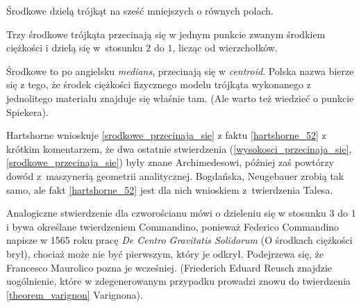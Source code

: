 Środkowe dzielą trójkąt na sześć mniejszych o równych polach.

\begin{proposition}
\label{srodkowe_przecinaja_sie}%
%
    Trzy środkowe trójkąta przecinają się w jednym punkcie zwanym środkiem ciężkości i dzielą się w~stosunku $2$ do $1$, licząc od wierzchołków.
\end{proposition}

Środkowe to po angielsku \emph{medians}, przecinają się w \emph{centroid}.
Polska nazwa bierze się z tego, że środek ciężkości fizycznego modelu trójkąta wykonanego z jednolitego materiału znajduje się właśnie tam.
(Ale warto też wiedzieć o punkcie Spiekera).

Hartshorne \cite[s. 52-54]{hartshorne2000} wnioskuje \ref{srodkowe_przecinaja_sie} z faktu \ref{hartshorne_52} z krótkim komentarzem, że dwa ostatnie stwierdzenia (\ref{wysokosci_przecinaja_sie}, \ref{srodkowe_przecinaja_sie}) były znane Archimedesowi, później zaś \cite[s. 119-120]{hartshorne2000} powtórzy dowód z~maszynerią geometrii analitycznej.
%
Bogdańska, Neugebauer zrobią tak samo, ale fakt \ref{hartshorne_52} jest dla nich wnioskiem z~twierdzenia Talesa.
%

Analogiczne stwierdzenie dla czworościanu mówi o dzieleniu się w stosunku $3$ do $1$ i bywa określane twierdzeniem Commandino, ponieważ Federico Commandino napisze w 1565 roku pracę \emph{De Centro Gravitatis Solidorum} (O środkach ciężkości brył), chociaż może nie być pierwszym, który je odkrył.
%
%
Podejrzewa się, że Francesco Maurolico pozna je wcześniej.
(Friederich Eduard Reusch znajdzie uogólnienie, które w zdegenerowanym przypadku prowadzi znowu do twierdzenia \ref{theorem_varignon} Varignona).